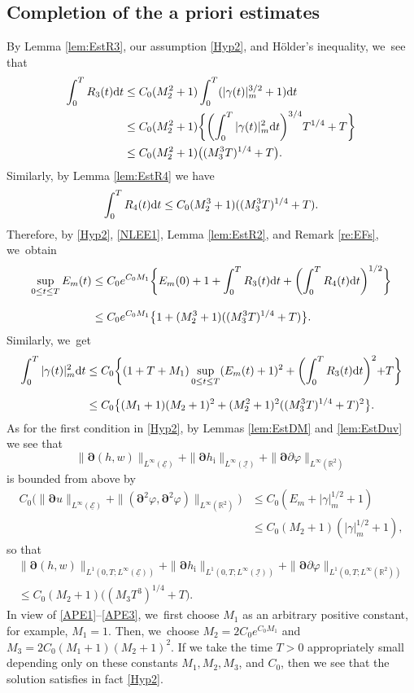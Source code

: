 \documentclass[JEP,XML,SOM,Unicode,NoFloatCountersInSection,published]{cedram}
\newcommand{\R}{{\mathbb R}}
\newcommand{\cI}{{\mathcal I}}
\newcommand{\cE}{{\mathcal E}}
\newcommand{\ul}[1]{\underline{#1}}
\theoremstyle{definition}
\begin{document}
\subsection{Completion of the a priori estimates}\label{sectAPE}
By Lemma \ref{lem:EstR3}, our assumption \eqref{Hyp2}, and Hölder's inequality, we~see that
\begin{align*}
\int_0^TR_3(t){\rm d}t
&\leq C_0(M_2^2+1)\int_0^T(|\gamma(t)|_m^{3/2}+1){\rm d}t \\
&\leq C_0(M_2^2+1)\biggl\{ \biggl(\int_0^T|\gamma(t)|_m^2{\rm d}t\biggr)^{3/4}T^{1/4} + T \biggl\} \\
&\leq C_0(M_2^2+1)\bigl((M_3^3T)^{1/4}+T\bigr).
\end{align*}
Similarly, by Lemma \ref{lem:EstR4} we have
\[
\int_0^TR_4(t){\rm d}t \leq C_0(M_2^3+1)((M_3^3T)^{1/4}+T).
\]
Therefore, by \eqref{Hyp2}, \eqref{NLEE1}, Lemma \ref{lem:EstR2}, and Remark \ref{re:EFs}, we~obtain
\begin{align}\label{APE1}
\sup_{0\leq t\leq T}E_m(t)
&\leq C_0 e^{C_0M_1}\biggl\{ E_m(0) + 1 + \int_0^TR_3(t){\rm d}t + \biggl(\int_0^TR_4(t){\rm d}t \biggr)^{1/2} \biggr\} \notag\\[-3pt] &\\[-5pt]
&\leq C_0 e^{C_0M_1}\bigl\{ 1 + (M_2^3+1)((M_3^3T)^{1/4}+T) \bigr\}.\notag
\end{align}
Similarly, we~get
\begin{align}\label{APE2}
\int_0^T|\gamma(t)|_m^2{\rm d}t
&\leq C_0 \biggl\{ (1+T+M_1)\sup_{0\leq t\leq T}(E_m(t)+1)^2 + \biggl(\int_0^TR_3(t){\rm d}t \biggl)^2 + T \biggr\}\notag \\ &\\[-10pt]
&\leq C_0 \bigl\{ (M_1+1)(M_2+1)^2 + (M_2^2+1)^2 ((M_3^3T)^{1/4}+T)^2 \bigr\}.\notag
\end{align}
As for the first condition in \eqref{Hyp2}, by Lemmas \ref{lem:EstDM} and \ref{lem:EstDuv} we see that
\[
\|\bm{\partial}(h,w)\|_{L^\infty(\ul{\cE})} + \|\bm{\partial} h_\mathrm{i}\|_{L^\infty(\ul{\cI})} + \|\bm{\partial}\partial\varphi\|_{L^\infty(\R^2)}
\]
is bounded from above by
\begin{align*}
C_0 \bigl(\|\bm{\partial}u\|_{L^\infty(\ul{\cE})} + \|(\bm{\partial}^2\varphi,\bm{\partial}^2\varphi)\|_{L^\infty(\R^2)} \bigr)
&\leq C_0 (E_m + |\gamma|_m^{1/2} + 1) \\
&\leq C_0(M_2+1)(|\gamma|_m^{1/2}+1),
\end{align*}
so that
\begin{multline}\label{APE3}
\|\bm{\partial}(h,w)\|_{L^1(0,T;L^\infty(\ul{\cE}))} + \|\bm{\partial} h_\mathrm{i}\|_{L^1(0,T;L^\infty(\ul{\cI}))}
+ \|\bm{\partial}\partial\varphi\|_{L^1(0,T;L^\infty(\R^2))} \\
\leq C_0(M_2+1)\bigl((M_3T^3)^{1/4}+T\bigr).
\end{multline}
In view of \eqref{APE1}--\eqref{APE3}, we~first choose $M_1$ as an arbitrary positive constant, for example, $M_1=1$.
Then, we~choose $M_2=2C_0e^{C_0M_1}$ and $M_3=2C_0(M_1+1)(M_2+1)^2$.
If we take the time $T>0$ appropriately small depending only on these constants $M_1,M_2,M_3$, and $C_0$,
then we see that the solution satisfies in fact \eqref{Hyp2}.
\end{document}

